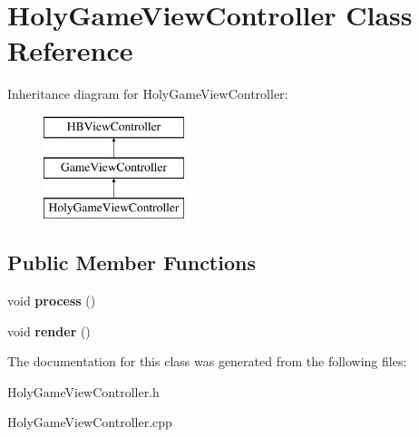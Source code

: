 \hypertarget{class_holy_game_view_controller}{\section{Holy\-Game\-View\-Controller Class Reference}
\label{class_holy_game_view_controller}
}
Inheritance diagram for Holy\-Game\-View\-Controller\-:\begin{figure}[H]
\begin{center}
\leavevmode
\includegraphics[height=3.000000cm]{class_holy_game_view_controller}
\end{center}
\end{figure}
\subsection*{Public Member Functions}
\begin{DoxyCompactItemize}
\item 
\hypertarget{class_holy_game_view_controller_a609559ed499e5d3c4c5102452efc1738}{void {\bfseries process} ()}\label{class_holy_game_view_controller_a609559ed499e5d3c4c5102452efc1738}

\item 
\hypertarget{class_holy_game_view_controller_a064f29bea316aa63bc5399419e1f356a}{void {\bfseries render} ()}\label{class_holy_game_view_controller_a064f29bea316aa63bc5399419e1f356a}

\end{DoxyCompactItemize}


The documentation for this class was generated from the following files\-:\begin{DoxyCompactItemize}
\item 
Holy\-Game\-View\-Controller.\-h\item 
Holy\-Game\-View\-Controller.\-cpp\end{DoxyCompactItemize}
